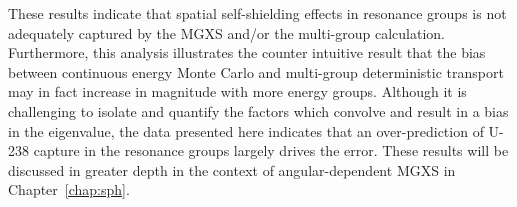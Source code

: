 These results indicate that spatial self-shielding effects in resonance groups is not adequately captured by the \ac{MGXS} and/or the multi-group calculation. Furthermore, this analysis illustrates the counter intuitive result that the bias between continuous energy Monte Carlo and multi-group deterministic transport may in fact increase in magnitude with more energy groups. Although it is challenging to isolate and quantify the factors which convolve and result in a bias in the eigenvalue, the data presented here indicates that an over-prediction of U-238 capture in the resonance groups largely drives the error. These results will be discussed in greater depth in the context of angular-dependent \ac{MGXS} in Chapter~\ref{chap:sph}.
